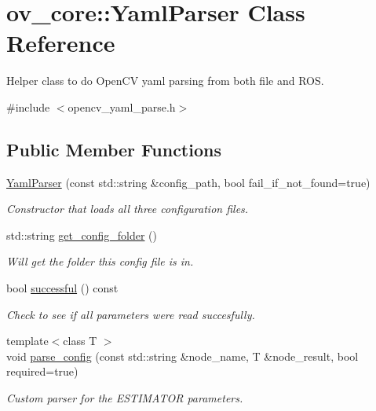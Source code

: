 \hypertarget{classov__core_1_1YamlParser}{}\section{ov\+\_\+core\+:\+:Yaml\+Parser Class Reference}
\label{classov__core_1_1YamlParser}


Helper class to do Open\+CV yaml parsing from both file and R\+OS.  




{\ttfamily \#include $<$opencv\+\_\+yaml\+\_\+parse.\+h$>$}

\subsection*{Public Member Functions}
\begin{DoxyCompactItemize}
\item 
\hyperlink{classov__core_1_1YamlParser_a4f4acc860b546d60f422a07d60eaa99b}{Yaml\+Parser} (const std\+::string \&config\+\_\+path, bool fail\+\_\+if\+\_\+not\+\_\+found=true)
\begin{DoxyCompactList}\small\item\em Constructor that loads all three configuration files. \end{DoxyCompactList}\item 
std\+::string \hyperlink{classov__core_1_1YamlParser_a76a8ca471859dd6fd22e1772c3d1aa44}{get\+\_\+config\+\_\+folder} ()
\begin{DoxyCompactList}\small\item\em Will get the folder this config file is in. \end{DoxyCompactList}\item 
bool \hyperlink{classov__core_1_1YamlParser_a05ee1de4577cdd64ad91a3f11c372714}{successful} () const
\begin{DoxyCompactList}\small\item\em Check to see if all parameters were read succesfully. \end{DoxyCompactList}\item 
{\footnotesize template$<$class T $>$ }\\void \hyperlink{classov__core_1_1YamlParser_aff9bc745ae8097ece9807ec4d0fbec2f}{parse\+\_\+config} (const std\+::string \&node\+\_\+name, T \&node\+\_\+result, bool required=true)
\begin{DoxyCompactList}\small\item\em Custom parser for the E\+S\+T\+I\+M\+A\+T\+OR parameters. \end{DoxyCompactList}\item 

\end{DoxyCompactItemize}
